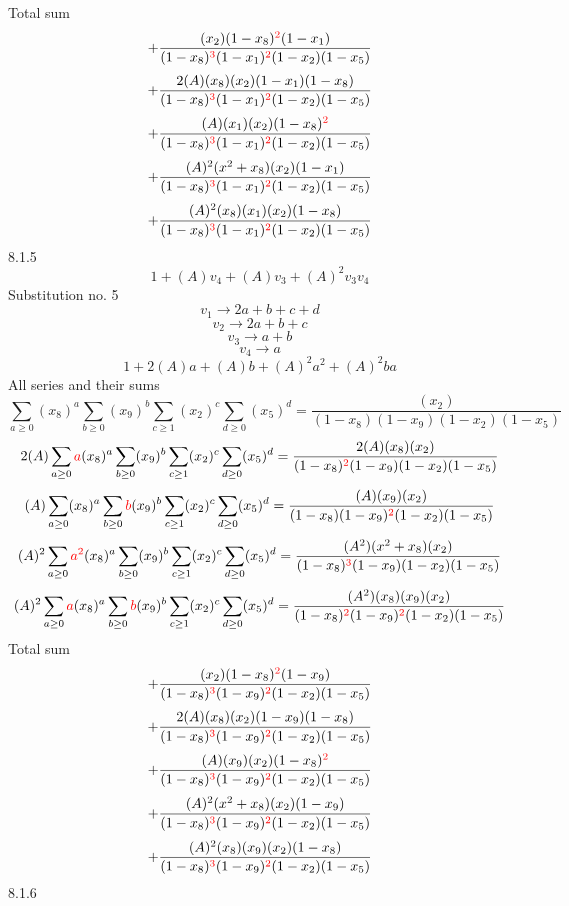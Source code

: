 \documentclass{article}
\begin{document}
Total sum
\[+\frac{(x_2)(1-x_8)^{\textcolor{red}{2}}(1-x_1)}{(1-x_8)^{\textcolor{red}{3}}(1-x_1)^{\textcolor{red}{2}}(1-x_2)(1-x_5)}\]\[+\frac{2(A)(x_8)(x_2)(1-x_1)(1-x_8)}{(1-x_8)^{\textcolor{red}{3}}(1-x_1)^{\textcolor{red}{2}}(1-x_2)(1-x_5)}\]\[+\frac{(A)(x_1)(x_2)(1-x_8)^{\textcolor{red}{2}}}{(1-x_8)^{\textcolor{red}{3}}(1-x_1)^{\textcolor{red}{2}}(1-x_2)(1-x_5)}\]\[+\frac{(A)^{2}(x^{2}+x_8)(x_2)(1-x_1)}{(1-x_8)^{\textcolor{red}{3}}(1-x_1)^{\textcolor{red}{2}}(1-x_2)(1-x_5)}\]\[+\frac{(A)^{2}(x_8)(x_1)(x_2)(1-x_8)}{(1-x_8)^{\textcolor{red}{3}}(1-x_1)^{\textcolor{red}{2}}(1-x_2)(1-x_5)}\]
8.1.5
\[1+(A)v_4+(A)v_3+(A)^2v_3v_4\]Substitution no. 5\[v_1\rightarrow{2a+b+c+d}\]\[v_2\rightarrow{2a+b+c}\]\[v_3\rightarrow{a+b}\]\[v_4\rightarrow{a}\]\[1+2(A)a+(A)b+(A)^2a^{2}+(A)^2ba\]All series and their sums\[\sum_{a\geq{0}}(x_8)^{a}\sum_{b\geq{0}}(x_9)^{b}\sum_{c\geq{1}}(x_2)^{c}\sum_{d\geq{0}}(x_5)^{d}=\frac{(x_2)}{(1-x_8)(1-x_9)(1-x_2)(1-x_5)}\]\[2(A)\sum_{a\geq{0}}\textcolor{red}{a}(x_8)^{a}\sum_{b\geq{0}}(x_9)^{b}\sum_{c\geq{1}}(x_2)^{c}\sum_{d\geq{0}}(x_5)^{d}=\frac{2(A)(x_8)(x_2)}{(1-x_8)^{\textcolor{red}{2}}(1-x_9)(1-x_2)(1-x_5)}\]\[(A)\sum_{a\geq{0}}(x_8)^{a}\sum_{b\geq{0}}\textcolor{red}{b}(x_9)^{b}\sum_{c\geq{1}}(x_2)^{c}\sum_{d\geq{0}}(x_5)^{d}=\frac{(A)(x_9)(x_2)}{(1-x_8)(1-x_9)^{\textcolor{red}{2}}(1-x_2)(1-x_5)}\]\[(A)^{2}\sum_{a\geq{0}}\textcolor{red}{a^{2}}(x_8)^{a}\sum_{b\geq{0}}(x_9)^{b}\sum_{c\geq{1}}(x_2)^{c}\sum_{d\geq{0}}(x_5)^{d}=\frac{(A^{2})(x^{2}+x_8)(x_2)}{(1-x_8)^{\textcolor{red}{3}}(1-x_9)(1-x_2)(1-x_5)}\]\[(A)^{2}\sum_{a\geq{0}}\textcolor{red}{a}(x_8)^{a}\sum_{b\geq{0}}\textcolor{red}{b}(x_9)^{b}\sum_{c\geq{1}}(x_2)^{c}\sum_{d\geq{0}}(x_5)^{d}=\frac{(A^{2})(x_8)(x_9)(x_2)}{(1-x_8)^{\textcolor{red}{2}}(1-x_9)^{\textcolor{red}{2}}(1-x_2)(1-x_5)}\]
Total sum
\[+\frac{(x_2)(1-x_8)^{\textcolor{red}{2}}(1-x_9)}{(1-x_8)^{\textcolor{red}{3}}(1-x_9)^{\textcolor{red}{2}}(1-x_2)(1-x_5)}\]\[+\frac{2(A)(x_8)(x_2)(1-x_9)(1-x_8)}{(1-x_8)^{\textcolor{red}{3}}(1-x_9)^{\textcolor{red}{2}}(1-x_2)(1-x_5)}\]\[+\frac{(A)(x_9)(x_2)(1-x_8)^{\textcolor{red}{2}}}{(1-x_8)^{\textcolor{red}{3}}(1-x_9)^{\textcolor{red}{2}}(1-x_2)(1-x_5)}\]\[+\frac{(A)^{2}(x^{2}+x_8)(x_2)(1-x_9)}{(1-x_8)^{\textcolor{red}{3}}(1-x_9)^{\textcolor{red}{2}}(1-x_2)(1-x_5)}\]\[+\frac{(A)^{2}(x_8)(x_9)(x_2)(1-x_8)}{(1-x_8)^{\textcolor{red}{3}}(1-x_9)^{\textcolor{red}{2}}(1-x_2)(1-x_5)}\]
8.1.6
\end{document}
